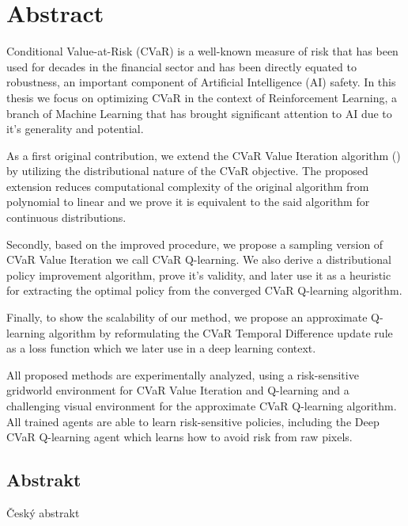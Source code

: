 \begingroup
\let\clearpage\relax
\let\cleardoublepage\relax
\let\cleardoublepage\relax

\chapter*{Abstract}


Conditional Value-at-Risk (CVaR) is a well-known measure of risk that has been used for decades in the financial sector and has been directly equated to robustness, an important component of Artificial Intelligence (AI) safety. In this thesis we focus on optimizing CVaR in the context of Reinforcement Learning, a branch of Machine Learning that has brought significant attention to AI due to it's generality and potential.

As a first original contribution, we extend the CVaR Value Iteration algorithm (\citet{chow2015risk}) by utilizing the distributional nature of the CVaR objective. The proposed extension reduces computational complexity of the original algorithm from polynomial to linear and we prove it is equivalent to the said algorithm for continuous distributions.

Secondly, based on the improved procedure, we propose a sampling version of CVaR Value Iteration we call CVaR Q-learning. We also derive a distributional policy improvement algorithm, prove it's validity, and later use it as a heuristic for extracting the optimal policy from the converged CVaR Q-learning algorithm.

Finally, to show the scalability of our method, we propose an approximate Q-learning algorithm by reformulating the CVaR Temporal Difference update rule as a loss function which we later use in a deep learning context.

All proposed methods are experimentally analyzed, using a risk-sensitive gridworld environment for CVaR Value Iteration and Q-learning and a challenging visual environment for the approximate CVaR Q-learning algorithm. All trained agents are able to learn risk-sensitive policies, including the  Deep CVaR Q-learning agent which learns how to avoid risk from raw pixels.



\vfill

\begin{otherlanguage}{czech}
\chapter*{Abstrakt}
Český abstrakt
\end{otherlanguage}

\endgroup

\vfill
